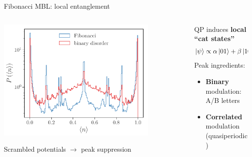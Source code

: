 \begin{frame}{Fibonacci MBL: local entanglement}
\begin{columns}
\begin{column}{0.5\textwidth}
\centering
\includegraphics[width=0.8\textwidth]{img/3_Fibonacci/local_observable_fibo_shuffle_p_8_h_5_L_22}

Scrambled potentials $\to$ peak suppression
\end{column}
\begin{column}{0.5\textwidth}
QP induces \textbf{local ``cat states''}
\[
	\ket{\psi} \propto \alpha \ket{01} + \beta \ket{10}
\]
Peak ingredients:
\begin{itemize}
	\item \textbf{Binary} modulation: A/B letters
	\item \textbf{Correlated} modulation (quasiperiodic)
\end{itemize}
\end{column}
\end{columns}
\end{frame}
